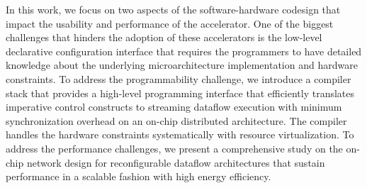 In this work, we focus on two aspects of the software-hardware codesign that impact the usability
and performance of the accelerator. One of the biggest challenges that hinders the adoption of these
accelerators is the low-level declarative configuration interface that requires the programmers to
have detailed knowledge about the underlying microarchitecture implementation and hardware
constraints. To address the programmability challenge, we introduce a compiler stack that provides a high-level
programming interface that efficiently translates imperative control constructs to streaming
dataflow execution with minimum synchronization overhead on an on-chip distributed architecture. The
compiler handles the hardware constraints systematically with resource virtualization. To address
the performance challenges, we present a comprehensive study on the on-chip network design for 
reconfigurable dataflow architectures that sustain performance in a scalable fashion with high energy efficiency.

